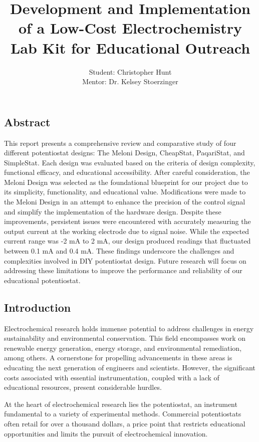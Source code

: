 \documentclass{article}
\title{\textcolor{mycolor}{\textbf{{\huge Development and Implementation of a Low-Cost Electrochemistry Lab Kit for Educational Outreach}}}}
\author{Student: Christopher Hunt \\ Mentor: Dr. Kelsey Stoerzinger}
\date{}
\begin{document}
\pagestyle{fancy}
\fancyhf{}
\rfoot{}
\rhead{\thepage}
\maketitle

\subsection*{Abstract}

This report presents a comprehensive review and comparative study of four different potentiostat designs: The Meloni Design, CheapStat, PaqariStat, and SimpleStat. Each design was evaluated based on the criteria of design complexity, functional efficacy, and educational accessibility. After careful consideration, the Meloni Design was selected as the foundational blueprint for our project due to its simplicity, functionality, and educational value. Modifications were made to the Meloni Design in an attempt to enhance the precision of the control signal and simplify the implementation of the hardware design. Despite these improvements, persistent issues were encountered with accurately measuring the output current at the working electrode due to signal noise. While the expected current range was -2 mA to 2 mA, our design produced readings that fluctuated between 0.1 mA and 0.4 mA. These findings underscore the challenges and complexities involved in DIY potentiostat design. Future research will focus on addressing these limitations to improve the performance and reliability of our educational potentiostat.
\subsection*{Introduction}
Electrochemical research holds immense potential to address challenges in energy sustainability and environmental conservation. This field encompasses work on renewable energy generation, energy storage, and environmental remediation, among others. A cornerstone for propelling advancements in these areas is educating the next generation of engineers and scientists. However, the significant costs associated with essential instrumentation, coupled with a lack of educational resources, present considerable hurdles.

At the heart of electrochemical research lies the potentiostat, an instrument fundamental to a variety of experimental methods. Commercial potentiostats often retail for over a thousand dollars, a price point that restricts educational opportunities and limits the pursuit of electrochemical innovation.
\end{document}
